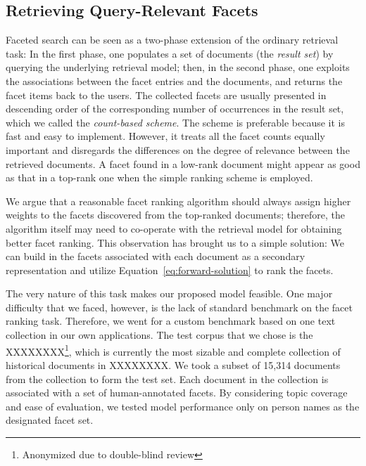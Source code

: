 \subsection{Retrieving Query-Relevant Facets}\label{s:facet-ranking}

Faceted search \cite{hearst2002finding,yee2003faceted,roy2008minimum}
can be seen as a two-phase extension of the ordinary retrieval
task: In the first phase, one populates a set of documents (the \emph{result
set}) by querying the underlying retrieval model; then, in the second phase,
one exploits the associations between the facet entries and the documents, and
returns the facet items back to the users.  The collected facets are usually
presented in descending order of the corresponding number of occurrences in the
result set, which we called the \emph{count-based scheme}.  The scheme is
preferable because it is fast and easy to implement.  However, it treats all
the facet counts equally important and disregards the differences on the degree
of relevance between the retrieved documents.  A facet found in a low-rank
document might appear as good as that in a top-rank one when the simple ranking
scheme is employed.

We argue that a reasonable facet ranking algorithm should always assign higher
weights to the facets discovered from the top-ranked documents; therefore, the
algorithm itself may need to co-operate with the retrieval model for obtaining
better facet ranking.  This observation has brought us to a simple solution: We
can build in the facets associated with each document as a secondary
representation and utilize Equation~\ref{eq:forward-solution} to rank the
facets.  


The very nature of this task makes our proposed model feasible.  One major
difficulty that we faced, however, is the lack of standard benchmark on the
facet ranking task.  Therefore, we went for a custom benchmark based on one
text collection in our own applications.  The test corpus that we chose is the
XXXXXXXX\footnote{Anonymized due to double-blind review}, which is currently
the most sizable and complete collection of historical documents in XXXXXXXX.
We took a subset of 15,314 documents from the collection to form the test set.
Each document in the collection is associated with a set of human-annotated
facets.  By considering topic coverage and ease of evaluation, we tested model
performance only on person names as the designated facet set.

